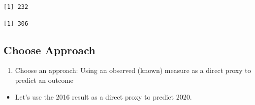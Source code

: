 \documentclass[
  letterpaper,
  DIV=11,
  numbers=noendperiod]{scrreprt}
\newenvironment{Shaded}{\begin{snugshade}}{\end{snugshade}}
\newcommand{\DecValTok}[1]{\textcolor[rgb]{0.68,0.00,0.00}{#1}}
\newcommand{\FunctionTok}[1]{\textcolor[rgb]{0.28,0.35,0.67}{#1}}
\newcommand{\NormalTok}[1]{\textcolor[rgb]{0.00,0.23,0.31}{#1}}
\newcommand{\OtherTok}[1]{\textcolor[rgb]{0.00,0.23,0.31}{#1}}
\newcommand{\SpecialCharTok}[1]{\textcolor[rgb]{0.37,0.37,0.37}{#1}}
\newcommand{\StringTok}[1]{\textcolor[rgb]{0.13,0.47,0.30}{#1}}
\providecommand{\tightlist}{%
  \setlength{\itemsep}{0pt}\setlength{\parskip}{0pt}}\usepackage{longtable,booktabs,array}
\begin{document}
\begin{Shaded}
\end{Shaded}

\begin{verbatim}
[1] 232
\end{verbatim}

\begin{Shaded}
\end{Shaded}

\begin{verbatim}
[1] 306
\end{verbatim}

\hypertarget{choose-approach}{%
\subsection{Choose Approach}\label{choose-approach}}

\begin{enumerate}
\def\labelenumi{\arabic{enumi})}
\tightlist
\item
  Choose an approach: Using an observed (known) measure as a direct
  proxy to predict an outcome
\end{enumerate}

\begin{itemize}
\tightlist
\item
  Let's use the 2016 result as a direct proxy to predict 2020.
\end{itemize}

\begin{Shaded}
\end{Shaded}
\end{document}
